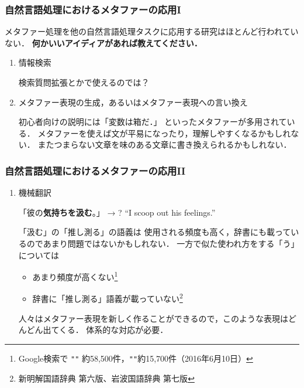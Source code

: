\documentclass[11pt]{beamer}
\newcommand{\maru}{。}
\newcommand\metaphorical[1]{\textcolor{sRed}{\textbf{#1}}}
\begin{document}
\begin{frame}
\frametitle{自然言語処理におけるメタファーの応用I}
メタファー処理を他の自然言語処理タスクに応用する研究はほとんど行われていない．
\textbf{何かいいアイディアがあれば教えてください．}
\begin{enumerate}
    \item 情報検索

        検索質問拡張とかで使えるのでは？


    \item メタファー表現の生成，あるいはメタファー表現への言い換え

        初心者向けの説明には「変数は箱だ．」
        といったメタファーが多用されている．
        メタファーを使えば文が平易になったり，理解しやすくなるかもしれない．
        またつまらない文章を味のある文章に書き換えられるかもしれない．


\end{enumerate}
\end{frame}

\begin{frame}
\frametitle{自然言語処理におけるメタファーの応用II}
\begin{enumerate}
    \addtocounter{enumi}{2}
    \item 機械翻訳

        「彼の\metaphorical{気持ちを汲む}{\maru}」 →  ? “I scoop out his feelings.”

        \bigskip

        「汲む」の「推し測る」の語義は
        使用される頻度も高く，辞書にも載っているのであまり問題ではないかもしれない．
        一方で似た使われ方をする「う」については

         \begin{itemize}
            \item あまり頻度が高くない\footnote[frame]{Google検索で \texttt{"}\texttt{"} 約58,500件，\texttt{"}\texttt{"}約15,700件（2016年6月10日）}
            \item 辞書に「推し測る」語義が載っていない\footnote[frame]{新明解国語辞典 第六版、岩波国語辞典 第七版}
         \end{itemize}

        人々はメタファー表現を新しく作ることができるので，このような表現はどんどん出てくる．
        体系的な対応が必要．

\end{enumerate}
\end{frame}
\end{document}
